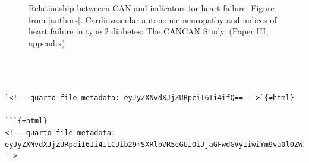 \documentclass[
  a4paper,
  headsepline=true,
  open=any]{scrbook}
\begin{document}
\begin{figure}

\begin{minipage}[t]{\linewidth}

{\centering 


\caption{Relationship betweeen CAN and indicators for heart failure.
Figure from {[}authors{]}. Cardiovascular autonomic neuropathy and
indices of heart failure in type 2 diabetes: The CANCAN Study. (Paper
III, appendix)}

}

\end{minipage}%

\end{figure}

\begin{verbatim}



`<!-- quarto-file-metadata: eyJyZXNvdXJjZURpciI6Ii4ifQ== -->`{=html}

```{=html}
<!-- quarto-file-metadata: eyJyZXNvdXJjZURpciI6Ii4iLCJib29rSXRlbVR5cGUiOiJjaGFwdGVyIiwiYm9va0l0ZW1OdW1iZXIiOjYsImJvb2tJdGVtRmlsZSI6IjYtZGlzY3Vzc2lvbi5xbWQiLCJib29rSXRlbURlcHRoIjowfQ== -->
\end{verbatim}
\end{document}
